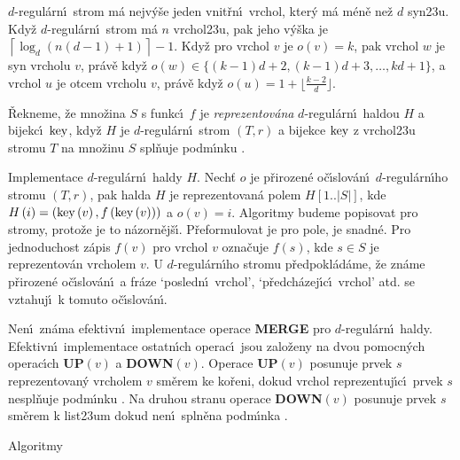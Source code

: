 $d$-regul\'arn\'\i\ strom m\'a nejv\'y\v se jeden vnit\v rn\'\i\ 
vrchol, kter\'y m\'a m\'en\v e ne\v z $d$ syn\accent23u. Kdy\v z 
$d$-regul\'arn\'\i\ strom m\'a $n$ vrchol\accent23u, pak jeho 
v\'y\v ska je $\left\lceil\log_d\left(n\left(d-1\right)+1\right)\right\rceil-1$. Kdy\v z pro vrchol 
$v$ je $o\left(v\right)=k$, pak vrchol $w$ je syn vrcholu $v$, pr\'av\v e 
kdy\v z $o\left(w\right)\in \{\left(k-1\right)d+2,\left(k-1\right)d+3,$$\dots,kd+1\}$, a vrchol $u$ je 
otcem vrcholu $v$, pr\'av\v e kdy\v z $o\left(u\right)=1+\lfloor\frac {k-2}d
\rfloor$. 
\endproclaim

\flushpar\v Rekneme, \v ze mno\v zina $S$ s funkc\'\i\ $f$ je 
\emph{reprezentov\'ana} $d$-regul\'ar\-n\'\i\ haldou $H$ a bijekc\'\i\ $\operatorname{key}$, kdy\v z 
$H$ je $d$-regul\'arn\'\i\ strom $\left(T,r\right)$ a bijekce $\operatorname{key}$ z vrchol\accent23u 
stromu $T$ na mno\v zinu $S$ spl\v nuje podm\'\i nku \thetag{usp}.  
\medskip

\flushpar Implementace $d$-regul\'arn\'\i\ haldy $H$. Nech\v t $o$ je 
p\v rirozen\'e o\v c\'\i s\-lo\-v\'a\-n\'\i\ $d$-regul\'arn\'\i ho stromu $
\left(T,r\right)$, pak halda $H$ je 
reprezentovan\'a polem $H\left[1..|S|\right]$, kde $H\left(i\right)=\left(\operatorname{key}\left(v\right),f\left(\operatorname{key}\left(v\right)\right)\right)$ a 
$o\left(v\right)=i$. Algoritmy budeme popisovat pro stromy, proto\v ze 
je to n\'azor\-n\v ej\-\v s\'\i . P\v reformulovat je pro pole, je 
snadn\'e. Pro jednoduchost z\'apis $f\left(v\right)$ pro vrchol $v$ 
ozna\v cuje $f\left(s\right)$, kde $s\in S$ je reprezentov\'an vrcholem $v$. U 
$d$-regul\'arn\'\i ho stromu p\v redpo\-kl\'a\-d\'ame, \v ze zn\'ame p\v rirozen\'e 
o\v c\'\i slov\'an\'\i\ a fr\'aze `posledn\'\i\ vrchol', `p\v red\-ch\'azej\'\i c\'\i\ 
vrchol'  atd. se vztahuj\'\i\ k tomuto o\v c\'\i slov\'a\-n\'\i .
\medskip

\flushpar Nen\'\i\ zn\'ama efektivn\'\i\ implementace operace 
{\bf MERGE} pro $d$-regul\'arn\'\i\ haldy.  Efektivn\'\i\ implementace 
ostatn\'\i ch operac\'\i\ jsou zalo\v zeny na dvou pomocn\'ych 
operac\'\i ch {\bf UP$\left(v\right)$} a {\bf DOWN$\left(v\right)$}.  Operace {\bf UP$\left(
v\right)$} posunuje 
prvek $s$ reprezentovan\'y vrcholem $v$ sm\v erem ke ko\v reni, 
dokud vrchol reprezentuj\'\i c\'\i\ prvek $s$ nespl\v nu\-je podm\'\i nku 
. Na druhou stranu operace {\bf DOWN$\left(v\right)$} posunuje prvek $s$ sm\v erem k 
list\accent23um dokud nen\'\i\ spln\v ena podm\'\i nka \thetag{usp}.  
\bigskip

\subhead
Algoritmy
\endsubhead
\medskip

